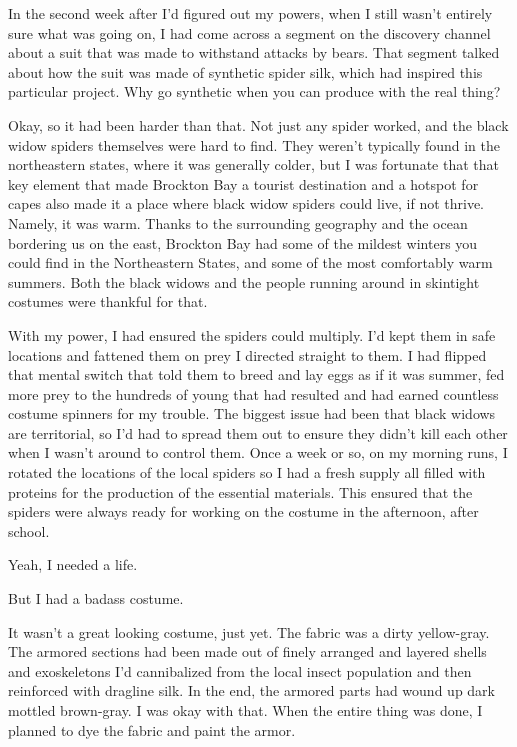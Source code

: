 In the second week after I'd figured out my powers, when I still wasn't entirely sure what was going on, I had come across a segment on the discovery channel about a suit that was made to withstand attacks by bears.  That segment talked about how the suit was made of synthetic spider silk, which had inspired this particular project.  Why go synthetic when you can produce with the real thing?



Okay, so it had been harder than that.  Not just any spider worked, and the black widow spiders themselves were hard to find.  They weren't typically found in the northeastern states, where it was generally colder, but I was fortunate that that key element that made Brockton Bay a tourist destination and a hotspot for capes also made it a place where black widow spiders could live, if not thrive.  Namely, it was warm.  Thanks to the surrounding geography and the ocean bordering us on the east, Brockton Bay had some of the mildest winters you could find in the Northeastern States, and some of the most comfortably warm summers.  Both the black widows and the people running around in skintight costumes were thankful for that.



With my power, I had ensured the spiders could multiply.  I'd kept them in safe locations and fattened them on prey I directed straight to them.  I had flipped that mental switch that told them to breed and lay eggs as if it was summer, fed more prey to the hundreds of young that had resulted and had earned countless costume spinners for my trouble.  The biggest issue had been that black widows are territorial, so I'd had to spread them out to ensure they didn't kill each other when I wasn't around to control them.  Once a week or so, on my morning runs, I rotated the locations of the local spiders so I had a fresh supply all filled with proteins for the production of the essential materials.  This ensured that the spiders were always ready for working on the costume in the afternoon, after school.



Yeah, I needed a life.



But I had a badass costume.



It wasn't a great looking costume, just yet.  The fabric was a dirty yellow-gray.  The armored sections had been made out of finely arranged and layered shells and exoskeletons I'd cannibalized from the local insect population and then reinforced with dragline silk.  In the end, the armored parts had wound up dark mottled brown-gray.  I was okay with that.  When the entire thing was done, I planned to dye the fabric and paint the armor.



